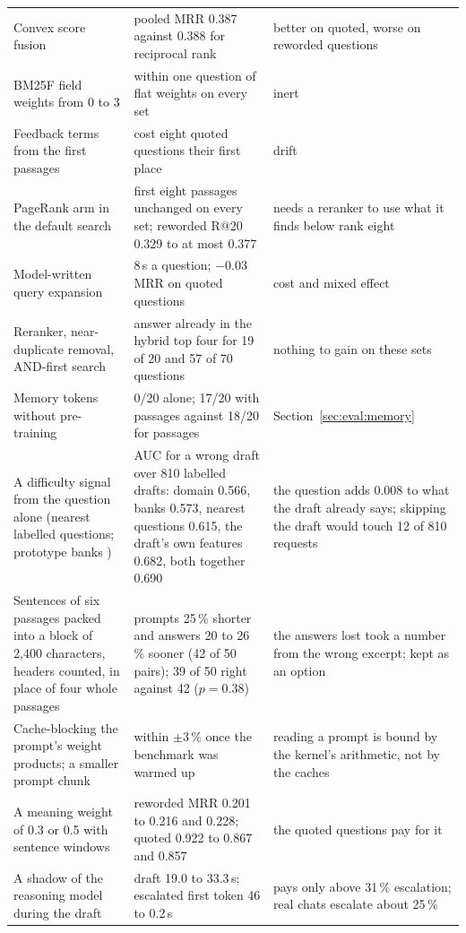 \begin{table}[t]
\begin{tabular}{@{}p{4.2cm}p{7.6cm}p{4.6cm}@{}}
Convex score fusion & pooled MRR 0.387 against 0.388 for reciprocal rank & better on quoted, worse on reworded questions \\
BM25F field weights from 0 to 3 & within one question of flat weights on every set & inert \\
Feedback terms from the first passages & cost eight quoted questions their first place & drift \\
PageRank arm in the default search & first eight passages unchanged on every set; reworded R@20 0.329 to at most 0.377 & needs a reranker to use what it finds below rank eight \\
Model-written query expansion & 8\,s a question; $-0.03$ MRR on quoted questions & cost and mixed effect \\
Reranker, near-duplicate removal, AND-first search & answer already in the hybrid top four for 19 of 20 and 57 of 70 questions & nothing to gain on these sets \\
Memory tokens without pre-training & 0/20 alone; 17/20 with passages against 18/20 for passages & Section~\ref{sec:eval:memory} \\
A difficulty signal from the question alone (nearest labelled questions; prototype banks \cite{semanticrouter2026}) & AUC for a wrong draft over 810 labelled drafts: domain 0.566, banks 0.573, nearest questions 0.615, the draft's own features 0.682, both together 0.690 & the question adds 0.008 to what the draft already says; skipping the draft would touch 12 of 810 requests \\
Sentences of six passages packed into a block of 2{,}400 characters, headers counted, in place of four whole passages & prompts 25\,\% shorter and answers 20 to 26\,\% sooner (42 of 50 pairs); 39 of 50 right against 42 ($p=0.38$) & the answers lost took a number from the wrong excerpt; kept as an option \\
Cache-blocking the prompt's weight products; a smaller prompt chunk & within $\pm3\,\%$ once the benchmark was warmed up & reading a prompt is bound by the kernel's arithmetic, not by the caches \\
A meaning weight of 0.3 or 0.5 with sentence windows & reworded MRR 0.201 to 0.216 and 0.228; quoted 0.922 to 0.867 and 0.857 & the quoted questions pay for it \\
A shadow of the reasoning model during the draft \cite{qiu2026shadowprefill} & draft 19.0 to 33.3\,s; escalated first token 46 to 0.2\,s & pays only above 31\,\% escalation; real chats escalate about 25\,\% \\

\end{tabular}
\end{table}
